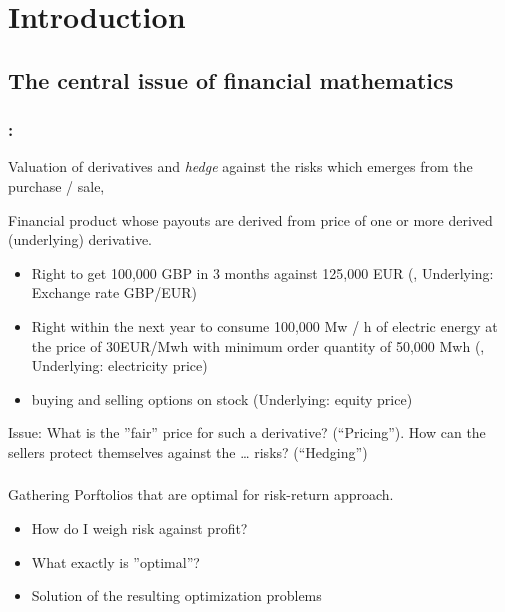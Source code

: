 \chapter{Introduction}
\section*{The central issue of financial mathematics}
\subsection*{:}
Valuation of derivatives and \emph{hedge} against the risks which emerges from the purchase / sale,

\begin{*definition}
	Financial product whose payouts are derived from price of one or more  derived (underlying) derivative.
\end{*definition}

\begin{*example}
	\begin{itemize}
		\item Right to get 100,000 GBP in 3 months against 125,000 EUR (, Underlying: Exchange rate GBP/EUR)
		\item Right within the next year to consume 100,000 Mw / h of electric energy at the price of 30EUR/Mwh with minimum order quantity of 50,000 Mwh (, Underlying: electricity price)
		\item buying and selling options on stock (Underlying: equity price)
	\end{itemize}
\end{*example}
Issue:  What is the ''fair'' price for such a derivative? (``Pricing''). How can the sellers protect themselves against the … risks? (``Hedging'')

\subsection*{}
Gathering Porftolios that are optimal for risk-return approach.
\begin{itemize}
	\item How do I weigh risk against profit?
	\item What exactly is ''optimal''?
	\item Solution of the resulting optimization problems
\end{itemize}

